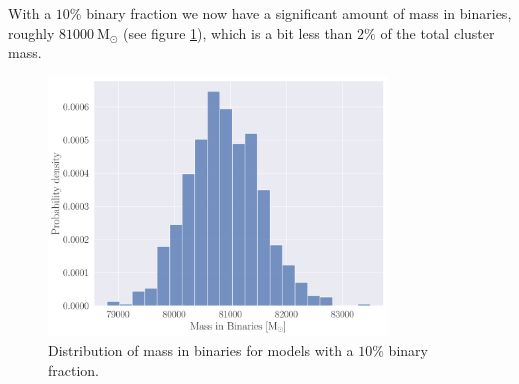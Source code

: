 With a $10\%$ binary fraction we now have a significant amount of mass in binaries, roughly $81000 \
	\mathrm{M_\odot}$ (see figure \ref{fig:high_bin_model_Bin_mass}), which is a bit less than
$2\%$ of the total cluster mass.

\begin{figure}
	\centering
	\includegraphics[width=0.8\textwidth]{figures/high_bin_model/binary_mass.png}
	\caption{Distribution of mass in binaries for models with a $10\%$ binary fraction.}
	\label{fig:high_bin_model_Bin_mass}
\end{figure}




